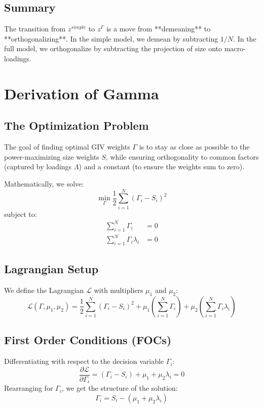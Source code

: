 \documentclass[12pt]{article}
\begin{document}
\subsection{Summary}
The transition from $z^{simple}$ to $z^{\Gamma}$ is a move from **demeaning** to **orthogonalizing**. In the simple model, we demean by subtracting $1/N$. In the full model, we orthogonalize by subtracting the projection of size onto macro-loadings.


\section{Derivation of Gamma}

\subsection{The Optimization Problem}
The goal of finding optimal GIV weights $\Gamma$ is to stay as close as possible to the power-maximizing size weights $S$, while ensuring orthogonality to common factors (captured by loadings $\Lambda$) and a constant (to ensure the weights sum to zero).

Mathematically, we solve:
\begin{equation}
    \min_{\Gamma} \frac{1}{2} \sum_{i=1}^N (\Gamma_i - S_i)^2
\end{equation}
subject to:
\begin{align}
    \sum_{i=1}^N \Gamma_i           & = 0 \tag{Constraint 1: Sum to Zero}                \\
    \sum_{i=1}^N \Gamma_i \lambda_i & = 0 \tag{Constraint 2: Orthogonality to $\lambda$}
\end{align}

\subsection{Lagrangian Setup}
We define the Lagrangian $\mathcal{L}$ with multipliers $\mu_1$ and $\mu_2$:
\begin{equation}
    \mathcal{L}(\Gamma, \mu_1, \mu_2) = \frac{1}{2} \sum_{i=1}^N (\Gamma_i - S_i)^2 + \mu_1 \left( \sum_{i=1}^N \Gamma_i \right) + \mu_2 \left( \sum_{i=1}^N \Gamma_i \lambda_i \right)
\end{equation}

\subsection{First Order Conditions (FOCs)}
Differentiating with respect to the decision variable $\Gamma_i$:
\begin{equation}
    \frac{\partial \mathcal{L}}{\partial \Gamma_i} = (\Gamma_i - S_i) + \mu_1 + \mu_2 \lambda_i = 0
\end{equation}
Rearranging for $\Gamma_i$, we get the structure of the solution:
\begin{equation} \label{eq:gamma_sol}
    \Gamma_i = S_i - (\mu_1 + \mu_2 \lambda_i)
\end{equation}
\end{document}
